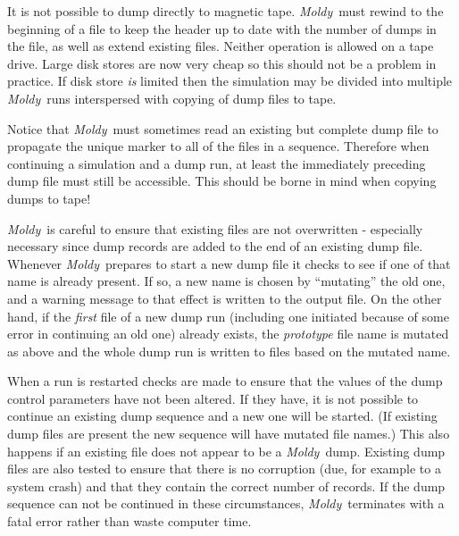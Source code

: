\documentclass[twoside]{report}
\newcommand{\moldy}{{\em Moldy}}
\begin{document}
It is not possible to dump directly to magnetic tape. \moldy\ must
rewind to the beginning of a file to keep the header up to date with
the number of dumps in the file, as well as extend existing files.
Neither operation is allowed on a tape drive.  Large disk stores are
now very cheap so this should not be a problem in practice.  If disk
store {\em is\/} limited then the simulation may be divided into
multiple \moldy\ runs interspersed with copying of dump files to
tape.

Notice that \moldy\  must sometimes read an existing but complete dump
file to propagate the unique marker to all of the files in a sequence.
Therefore when continuing a simulation and a dump run, at least
the immediately preceding dump file must still be accessible.  This
should be borne in mind when copying dumps to tape!

\moldy\  is careful to ensure that existing files are not
overwritten - especially necessary since dump records are added to
the end of an existing dump file.  Whenever \moldy\  prepares to start a
new dump file it checks to see if one of that name is already present.
If so, a new name is chosen by ``mutating'' the old one, and a warning
message to that effect is written to the output file. On the other
hand, if the {\em first\/} file of a new dump run (including one
initiated because of some error in continuing an old one) already
exists, the {\em prototype\/} file name is mutated as above and the
whole dump run is written to files based on the mutated name.

When a run is restarted checks are made to ensure that the values of
the dump control parameters have not been altered.  If they
have, it is not possible to continue an existing dump sequence and a
new one will be started.  (If existing dump files are present the new
sequence will have mutated file names.)  This also happens if an
existing file does not appear to be a \moldy\  dump.  Existing dump
files are also tested to ensure that there is no corruption (due, for
example to a system crash) and that they contain the correct number of
records.  If the dump sequence can not be continued in these
circumstances, \moldy\  terminates with a fatal error rather than waste
computer time.

\end{document}
